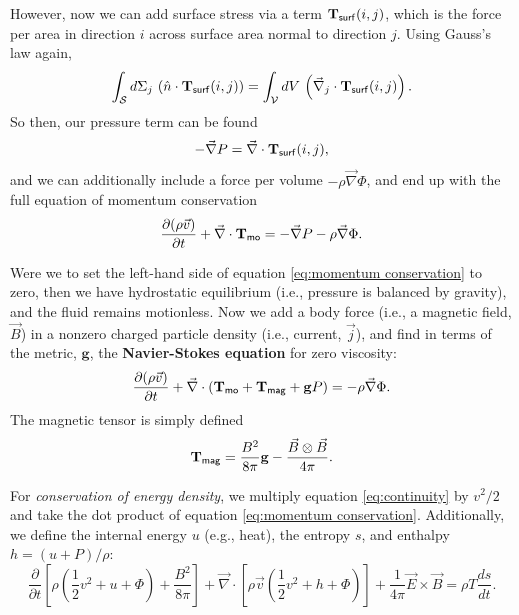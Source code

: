 \documentclass{tufte-handout}
\renewcommand{\textbf}[1]{{\bf \textcolor{dark-gray}{#1}}}
\renewcommand{\rm}{\sf}
\begin{document}
However, now we can add surface stress via a term $\mathbf{T_{\rm surf}}(i,j)$, which is the force per area in direction $i$ across surface area normal to direction $j$. Using Gauss's law again, 
\begin{equation}
\int_{\mathcal S}d\Sigma_j \, \left (\hat n \cdot \mathbf{T_{\rm surf}}(i,j)\right ) = \int_{\mathcal V} dV\, \left (\vec \nabla_j \cdot \mathbf T_{\rm surf}(i,j)\right ).
\end{equation}
So then, our pressure term can be found
\[-\vec \nabla P = \vec \nabla \cdot \mathbf T_{\rm surf}(i,j),\]
and we can additionally include a force per volume $-\rho \vec \nabla \Phi$, and end up with the full equation of momentum conservation
\begin{equation}
\label{eq:momentum conservation}
\frac{\partial (\rho \vec v)}{\partial t} + \vec \nabla \cdot \mathbf T_{\rm mo} = -\vec \nabla P - \rho \vec \nabla \Phi.
\end{equation}

Were we to set the left-hand side of equation \eqref{eq:momentum conservation} to zero, then we have hydrostatic equilibrium (i.e., pressure is balanced by gravity), and the fluid remains motionless. Now we add a body force (i.e., a magnetic field, $\vec B$) in a nonzero charged particle density (i.e., current, $\vec j$), and find in terms of the metric, $\mathbf g$, the \textbf{Navier-Stokes equation} for zero viscosity:
\begin{equation}
\label{eq:Navier-Stokes}
\frac{\partial(\rho \vec v)}{\partial t} + \vec \nabla \cdot \left (\mathbf T_{\rm mo} + \mathbf T_{\rm mag} + \mathbf g P\right ) = -\rho \vec\nabla \Phi.
\end{equation}
The magnetic tensor is simply defined
\[\mathbf T_{\rm mag} = \frac{B^2}{8\pi}\mathbf g - \frac{\vec B \otimes \vec B}{4\pi}.\]


For \textit{conservation of energy density}, we multiply equation \eqref{eq:continuity} by $v^2/2$ and take the dot product of equation \eqref{eq:momentum conservation}. Additionally, we define the internal energy $u$ (e.g., heat), the entropy $s$, and enthalpy $h = (u+P)/\rho$:
\begin{equation}
\label{eq:energy density conservation}
\frac{\partial}{\partial t}\left [\rho \left (\frac{1}{2}v^2 + u + \Phi\right ) + \frac{B^2}{8\pi}\right ] + \vec \nabla \cdot \left [\rho \vec v\left (\frac{1}{2}v^2 + h + \Phi\right)\right ] + \frac{1}{4\pi}\vec E \times \vec B = \rho T \frac{ds}{dt}.
\end{equation}
\end{document}
